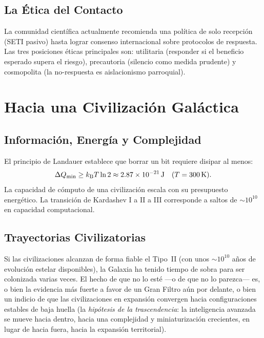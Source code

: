 \documentclass[12pt,a4paper]{article}
\newcommand{\kB}{k_{\mathrm{B}}}
\begin{document}
\subsection{La Ética del Contacto}

La comunidad científica actualmente recomienda una política de solo recepción
(SETI pasivo) hasta lograr consenso internacional sobre protocolos de
respuesta. Las tres posiciones éticas principales son: utilitaria (responder
si el beneficio esperado supera el riesgo), precautoria (silencio como
medida prudente) y cosmopolita (la no-respuesta es aislacionismo parroquial).

\section{Hacia una Civilización Galáctica}

\subsection{Información, Energía y Complejidad}

El principio de Landauer establece que borrar un bit requiere disipar al
menos:
\begin{equation}
  \Delta Q_{\min} \geq \kB T \ln 2 \approx \SI{2{,}87e-21}{\joule}
  \quad (T = \SI{300}{\kelvin}).
\end{equation}
La capacidad de cómputo de una civilización escala con su presupuesto
energético. La transición de Kardashev I a II a III corresponde a saltos de
$\sim 10^{10}$ en capacidad computacional.

\subsection{Trayectorias Civilizatorias}

Si las civilizaciones alcanzan de forma fiable el Tipo~II (con unos
$\sim 10^{10}$ años de evolución estelar disponibles), la Galaxia ha tenido
tiempo de sobra para ser colonizada varias veces. El hecho de que no lo
esté ---o de que no lo parezca--- es, o bien la evidencia más fuerte a favor de
un Gran Filtro aún por delante, o bien un indicio de que las civilizaciones en
expansión convergen hacia configuraciones estables de baja huella (la
\emph{hipótesis de la trascendencia}: la inteligencia avanzada se mueve hacia
dentro, hacia una complejidad y miniaturización crecientes, en lugar de hacia
fuera, hacia la expansión territorial).
\end{document}
